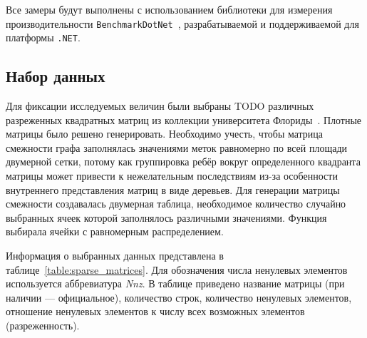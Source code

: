 Все замеры будут выполнены с использованием библиотеки для измерения производительности \texttt{BenchmarkDotNet}~\cite{benchTool}, разрабатываемой и поддерживаемой для платформы \texttt{.NET}.

\subsection{Набор данных}
Для фиксации исследуемых величин были выбраны TODO различных разреженных квадратных матриц из коллекции университета Флориды~\cite{matrixData}.
Плотные матрицы было решено генерировать. Необходимо учесть, чтобы матрица смежности графа заполнялась значениями меток равномерно по всей площади двумерной сетки, потому как группировка ребёр вокруг определенного квадранта матрицы может привести к нежелательным последствиям из-за особенности внутреннего представления матриц в виде деревьев. Для генерации матрицы смежности создавалась двумерная таблица, необходимое количество случайно выбранных ячеек которой заполнялось различными значениями. Функция выбирала ячейки с равномерным распределением.

Информация о выбранных данных представлена в таблице~\ref{table:sparse_matrices}. 
Для обозначения числа ненулевых элементов используется аббревиатура \textit{Nnz}. В таблице приведено название матрицы (при наличии --- официальное), количество строк, количество ненулевых элементов, отношение ненулевых элементов к числу всех возможных элементов (разреженность).

\begin{table}[h]
\begin{center}
\caption{Разреженные матричные данные}
\label{table:sparse_matrices}
\end{center}
\end{table}


